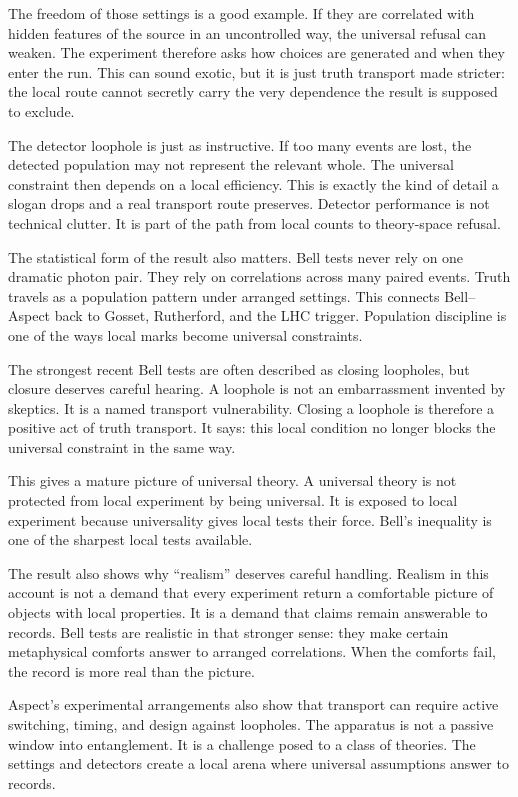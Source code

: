 The freedom of those settings is a good example. If they are correlated
with hidden features of the source in an uncontrolled way, the universal
refusal can weaken. The experiment therefore asks how choices are
generated and when they enter the run. This can sound exotic, but it is
just truth transport made stricter: the local route cannot secretly carry
the very dependence the result is supposed to exclude.

The detector loophole is just as instructive. If too many events are
lost, the detected population may not represent the relevant whole. The
universal constraint then depends on a local efficiency. This is exactly
the kind of detail a slogan drops and a real transport route preserves.
Detector performance is not technical clutter. It is part of the path
from local counts to theory-space refusal.

The statistical form of the result also matters. Bell tests never rely
on one dramatic photon pair. They rely on correlations across many
paired events. Truth travels as a population pattern under arranged
settings. This connects Bell--Aspect back to Gosset, Rutherford, and the
LHC trigger. Population discipline is one of the ways local marks become
universal constraints.

The strongest recent Bell tests are often described as closing loopholes,
but closure deserves careful hearing. A loophole is not an embarrassment
invented by skeptics. It is a named transport vulnerability. Closing a
loophole is therefore a positive act of truth transport. It says: this
local condition no longer blocks the universal constraint in the same
way.

This gives a mature picture of universal theory. A universal theory is
not protected from local experiment by being universal. It is exposed to
local experiment because universality gives local tests their force.
Bell's inequality is one of the sharpest local tests available.

The result also shows why ``realism'' deserves careful handling. Realism
in this account is not a demand that every experiment return a
comfortable picture of objects with local properties. It is a demand that
claims remain answerable to records. Bell tests are realistic in that
stronger sense: they make certain metaphysical comforts answer to
arranged correlations. When the comforts fail, the record is more real
than the picture.

Aspect's experimental arrangements also show that transport can require
active switching, timing, and design against loopholes. The apparatus is
not a passive window into entanglement. It is a challenge posed to a
class of theories. The settings and detectors create a local arena where
universal assumptions answer to records.


